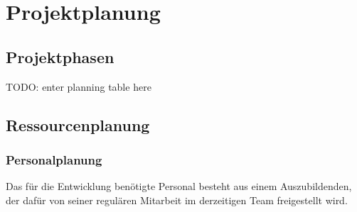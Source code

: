 \section{Projektplanung}
\label{sec:Projektplanung}


\subsection{Projektphasen}
\label{sec:Projektphasen}

TODO: enter planning table here

%
%
%
%

\subsection{Ressourcenplanung}
\label{sec:Ressourcenplanung}
\subsubsection{Personalplanung}
\label{sec:Personalplanung}
Das für die Entwicklung benötigte Personal besteht aus einem Auszubildenden, der dafür von seiner
regulären Mitarbeit im derzeitigen Team freigestellt wird.
